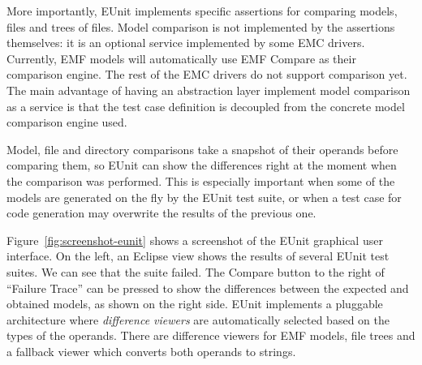 More importantly, EUnit implements specific assertions for comparing models, files and trees of files. Model comparison is not implemented by the assertions themselves: it is an optional service implemented by some EMC drivers. Currently, EMF models will automatically use EMF Compare as their comparison engine. The rest of the EMC drivers do not support comparison yet.  The main advantage of having an abstraction layer implement model comparison as a service is that the test case definition is decoupled from the concrete model comparison engine used.

Model, file and directory comparisons take a snapshot of their operands before comparing them, so EUnit can show the differences right at the moment when the comparison was performed. This is especially important when some of the models are generated on the fly by the EUnit test suite, or when a test case for code generation may overwrite the results of the previous one.

Figure~\ref{fig:screenshot-eunit} shows a screenshot of the EUnit graphical user interface. On the left, an Eclipse view shows the results of several EUnit test suites. We can see that the  suite failed. The Compare button to the right of ``Failure Trace'' can be pressed to show the differences between the expected and obtained models, as shown on the right side. EUnit implements a pluggable architecture where \emph{difference viewers} are automatically selected based on the types of the operands. There are difference viewers for EMF models, file trees and a fallback viewer which converts both operands to strings.

